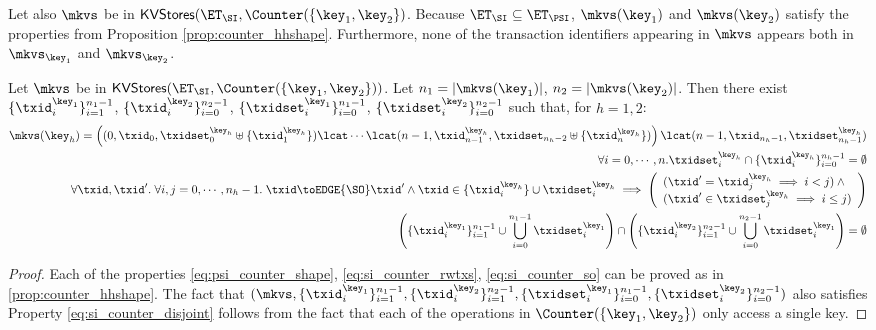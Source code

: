 Let also $\mkvs$ be in $\mathsf{KVStores}(\ET_{\SI}, \Counter(\{\key_1, \key_2\})$. Because 
$\ET_{\SI} \subseteq \ET_{\PSI}$, $\mkvs(\key_1)$ and $\mkvs(\key_2)$ satisfy the 
properties from Proposition \ref{prop:counter_hhshape}. 
Furthermore, none of the transaction identifiers appearing in $\mkvs$ appears 
both in $\mkvs_{\key_1}$ and $\mkvs_{\key_2}$.
\begin{proposition}
\label{prop:si_counter_hhshape1}
Let $\mkvs$ be in $\mathsf{KVStores}(\ET_{\SI}, \Counter(\{\key_1, \key_2\}))$. 
Let $n_1 = \lvert \mkvs(\key_1) \rvert$, $n_2 = \lvert \mkvs(\key_2) \rvert$. 
Then there exist $\{\txid_{i}^{\key_1}\}_{i=1}^{n_1 - 1}$, $\{\txid_{i}^{\key_2}\}_{i=0}^{n_2 - 1}$, 
$\{\txidset_{i}^{\key_1}\}_{i=0}^{n_1-1}$, $\{\txidset_{i}^{\key_2}\}_{i=0}^{n_2 - 1}$ such that, 
for $h = 1,2$: 
\begin{align}
\mkvs(\key_{h}) = \left( (0, \txid_{0}, \txidset^{\key_{h}}_{0} \uplus \{\txid^{\key_{h}}_1\}) \lcat \cdots \lcat (n-1, \txid^{\key_{h}}_{n-1}, \txidset_{n_{h}-2} \uplus \{\txid^{\key_{h}}_{n}\}) \right) 
\lcat (n-1, \txid_{n_{h} - 1}, \txidset^{\key_{h}}_{n_{h} - 1}) \label{eq:si_counter_shape}\\
\forall i=0,\cdots,n.\txidset^{\key_{h}}_{i} \cap \{\txid^{\key_{h}}_{i}\}_{i=0}^{n_{h}-1} = \emptyset \label{eq:si_counter_rwtxs}\\
\forall \txid, \txid'.\;\forall i,j=0,\cdots, n_{h} - 1.\; \txid \toEDGE{\SO} \txid' 
\land \txid \in \{\txid^{\key_{h}}_{i}\} \cup \txidset^{\key_{h}}_{i} \implies 
\left(\begin{array}{l}
(\txid' = \txid^{\key_{h}}_{j} \implies i < j) \land {} \\
(\txid' \in \txidset^{\key_{h}}_{j} \implies i \leq j) \\
\end{array}\right) \label{eq:si_counter_so}\\
\left( \{\txid^{\key_{1}}_{i}\}_{i=1}^{n_1 -1} \cup \bigcup_{i=0}^{n_1 - 1} \txidset_{i}^{\key_1} \right) \cap 
\left( \{\txid^{\key_{2}}_{i}\}_{i=1}^{n_2 -1} \cup \bigcup_{i=0}^{n_2 - 1} \txidset_{i}^{\key_1} \right) = \emptyset \label{eq:si_counter_disjoint}
\end{align}

\end{proposition}

\begin{proof}
Each of the properties \eqref{eq:psi_counter_shape}, \eqref{eq:si_counter_rwtxs}, \eqref{eq:si_counter_so} 
can be proved as in \cref{prop:counter_hhshape}. The fact that $(\mkvs, \{\txid_{i}^{\key_{1}}\}_{i=1}^{n_1 - 1}, \{\txid^{\key_2}_{i}\}_{i=1}^{n_2 - 1}, 
\{\txidset_{i}^{\key_1}\}_{i=0}^{n_1 - 1}, \{\txidset_{i}^{\key_2}\}_{i=0}^{n_2-1})$ also satisfies Property \eqref{eq:si_counter_disjoint} 
follows from the fact that each of the operations in $\Counter(\{\key_1, \key_2\})$ only access a single key. 
\end{proof}

